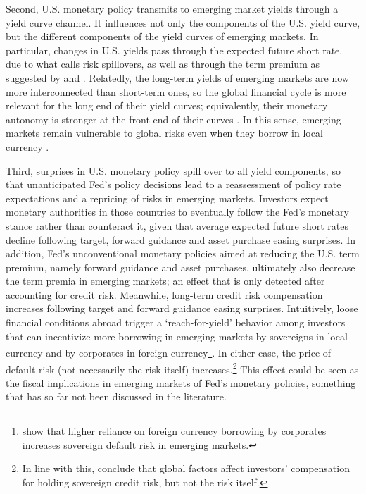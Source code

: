 {Second, U.S. monetary policy transmits to emerging market yields through a yield curve channel. 
It influences not only the components of the U.S. yield curve, but the different components of the yield curves of emerging markets. 
In particular, changes in U.S. yields pass through the expected future short rate, due to what \cite{Kalemli-Ozcan:2019} calls risk spillovers, as well as through the term premium as suggested by \cite{Turner:2014} and \cite{KolasaWesolowski:2020}. 
Relatedly, the long-term yields of emerging markets are now more interconnected than short-term ones, so the global financial cycle is more relevant for the long end of their yield curves; equivalently, their monetary autonomy is stronger at the front end of their curves \citep{Obstfeld:2015}. 
In this sense, emerging markets remain vulnerable to global risks even when they borrow in local currency \citep{CarstensShin:2019}.

Third, surprises in U.S. monetary policy spill over to all yield components, so that unanticipated Fed's policy decisions lead to a reassessment of policy rate expectations and a repricing of risks in emerging markets. 
Investors expect monetary authorities in those countries to eventually follow the Fed's monetary stance rather than counteract it, given that average expected future short rates decline following target, forward guidance and asset purchase easing surprises.
In addition, Fed's unconventional monetary policies aimed at reducing the U.S. term premium, namely forward guidance and asset purchases, ultimately also decrease the term premia in emerging markets; an effect that is only detected after accounting for credit risk. 
Meanwhile, long-term credit risk compensation increases following target and forward guidance easing surprises. 
Intuitively, loose financial conditions abroad trigger a `reach-for-yield' behavior among investors \citep{HausmanWongswan:2011} that can incentivize more borrowing in emerging markets by sovereigns in local currency \citep{BigioNunoPassadore:2018} and by corporates in foreign currency\footnote{\cite{DuSchreger:2017WP} show that higher reliance on foreign currency borrowing by corporates increases sovereign default risk in emerging markets.}. 
In either case, the price of default risk (not necessarily the risk itself) increases.\footnote{In line with this, \cite{JeanneretSouissi:2016} conclude that global factors affect investors’ compensation for holding sovereign credit risk, but not the risk itself.} 
This effect could be seen as the fiscal implications in emerging markets of Fed's monetary policies, something that has so far not been discussed in the literature. 

}
